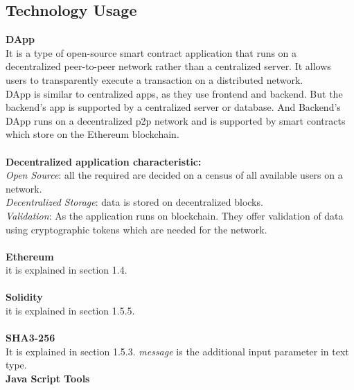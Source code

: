\subsection{Technology Usage}
\textbf{DApp} \\
It is a type of open-source smart contract application that runs on a decentralized peer-to-peer network rather than a centralized server. It allows users to transparently execute a transaction on a distributed network. \\
DApp is similar to centralized apps, as they use frontend and backend. But the backend's app is supported by a centralized server or database. And Backend's DApp runs on a decentralized p2p network and is supported by smart contracts which store on the Ethereum blockchain.\\
\\
\textbf{Decentralized application characteristic:}\\
	\textit{Open Source}: all the required are decided on a census of all available users on a network.\\
	\textit{Decentralized Storage}: data is stored on decentralized blocks.\\
	\textit{Validation}: As the application runs on blockchain. They offer validation of data using cryptographic tokens which are needed for the network. \\
 \\
\textbf{Ethereum} \\
it is explained in section 1.4.\\
\\
\textbf{Solidity} \\
it is explained in section 1.5.5.\\
\\
\textbf{SHA3-256} \\It is explained in section 1.5.3.
\textit{message} is the additional input parameter in text type\cite{fips}.\\
\textbf{Java Script Tools} 
